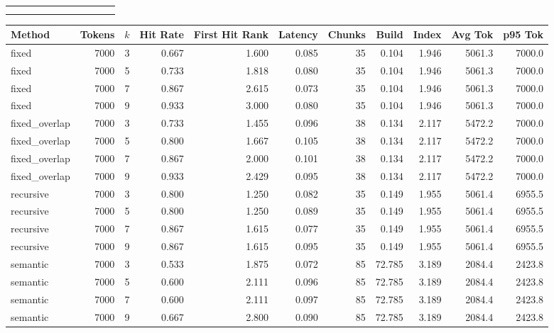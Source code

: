 \documentclass[pdflatex,sn-mathphys-num]{sn-jnl}
\theoremstyle{thmstyleone}
\theoremstyle{thmstyletwo}
\theoremstyle{thmstylethree}
\begin{document}
\begin{appendices}
\begin{table}
\begin{tabular}{@{}lrrrrrrrrrr@{}}
\botrule
\multicolumn{11}{r}{\textit{Continued on next page}} \\
\botrule
\end{tabular}

\end{table}

\begin{table}
\begin{tabular}{@{}lrrrrrrrrrr@{}}
\toprule
Method & Tokens & $k$ & Hit Rate & First Hit Rank & Latency & Chunks & Build & Index & Avg Tok & p95 Tok \\
\midrule

fixed & 7000 & 3 & 0.667 & 1.600 & 0.085 & 35 & 0.104 & 1.946 & 5061.3 & 7000.0 \\
fixed & 7000 & 5 & 0.733 & 1.818 & 0.080 & 35 & 0.104 & 1.946 & 5061.3 & 7000.0 \\
fixed & 7000 & 7 & 0.867 & 2.615 & 0.073 & 35 & 0.104 & 1.946 & 5061.3 & 7000.0 \\
fixed & 7000 & 9 & 0.933 & 3.000 & 0.080 & 35 & 0.104 & 1.946 & 5061.3 & 7000.0 \\
fixed\_overlap & 7000 & 3 & 0.733 & 1.455 & 0.096 & 38 & 0.134 & 2.117 & 5472.2 & 7000.0 \\
fixed\_overlap & 7000 & 5 & 0.800 & 1.667 & 0.105 & 38 & 0.134 & 2.117 & 5472.2 & 7000.0 \\
fixed\_overlap & 7000 & 7 & 0.867 & 2.000 & 0.101 & 38 & 0.134 & 2.117 & 5472.2 & 7000.0 \\
fixed\_overlap & 7000 & 9 & 0.933 & 2.429 & 0.095 & 38 & 0.134 & 2.117 & 5472.2 & 7000.0 \\
recursive & 7000 & 3 & 0.800 & 1.250 & 0.082 & 35 & 0.149 & 1.955 & 5061.4 & 6955.5 \\
recursive & 7000 & 5 & 0.800 & 1.250 & 0.089 & 35 & 0.149 & 1.955 & 5061.4 & 6955.5 \\
recursive & 7000 & 7 & 0.867 & 1.615 & 0.077 & 35 & 0.149 & 1.955 & 5061.4 & 6955.5 \\
recursive & 7000 & 9 & 0.867 & 1.615 & 0.095 & 35 & 0.149 & 1.955 & 5061.4 & 6955.5 \\
semantic & 7000 & 3 & 0.533 & 1.875 & 0.072 & 85 & 72.785 & 3.189 & 2084.4 & 2423.8 \\
semantic & 7000 & 5 & 0.600 & 2.111 & 0.096 & 85 & 72.785 & 3.189 & 2084.4 & 2423.8 \\
semantic & 7000 & 7 & 0.600 & 2.111 & 0.097 & 85 & 72.785 & 3.189 & 2084.4 & 2423.8 \\
semantic & 7000 & 9 & 0.667 & 2.800 & 0.090 & 85 & 72.785 & 3.189 & 2084.4 & 2423.8 \\

\end{tabular}
\end{table}
\end{appendices}
\end{document}
